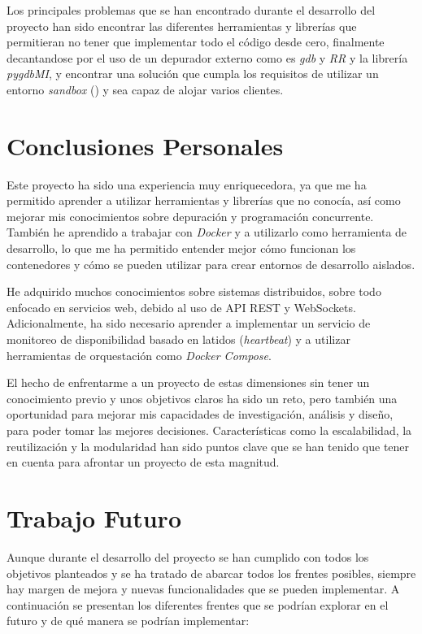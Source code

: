 Los principales problemas que se han encontrado durante el desarrollo del proyecto han sido encontrar las diferentes herramientas y librerías que permitieran no tener que implementar todo el código desde cero, finalmente decantandose por el uso de un depurador externo como es \textit{gdb} y \textit{RR} y la librería \textit{pygdbMI}, y encontrar una solución que cumpla los requisitos de utilizar un entorno \textit{sandbox} () y sea capaz de alojar varios clientes.

\section{Conclusiones Personales}\label{sec:conclusiones_personales}

Este proyecto ha sido una experiencia muy enriquecedora, ya que me ha permitido aprender a utilizar herramientas y librerías que no conocía, así como mejorar mis conocimientos sobre depuración y programación concurrente. También he aprendido a trabajar con \textit{Docker} y a utilizarlo como herramienta de desarrollo, lo que me ha permitido entender mejor cómo funcionan los contenedores y cómo se pueden utilizar para crear entornos de desarrollo aislados.

He adquirido muchos conocimientos sobre sistemas distribuidos, sobre todo enfocado en servicios web, debido al uso de API REST y WebSockets. Adicionalmente, ha sido necesario aprender a implementar un servicio de monitoreo de disponibilidad basado en latidos (\textit{heartbeat}) y a utilizar herramientas de orquestación como \textit{Docker Compose}.

El hecho de enfrentarme a un proyecto de estas dimensiones sin tener un conocimiento previo y unos objetivos claros ha sido un reto, pero también una oportunidad para mejorar mis capacidades de investigación, análisis y diseño, para poder tomar las mejores decisiones. Características como la escalabilidad, la reutilización y la modularidad han sido puntos clave que se han tenido que tener en cuenta para afrontar un proyecto de esta magnitud.

\section{Trabajo Futuro}\label{sec:trabajo_futuro}

Aunque durante el desarrollo del proyecto se han cumplido con todos los objetivos planteados y se ha tratado de abarcar todos los frentes posibles, siempre hay margen de mejora y nuevas funcionalidades que se pueden implementar. A continuación se presentan los diferentes frentes que se podrían explorar en el futuro y de qué manera se podrían implementar:

